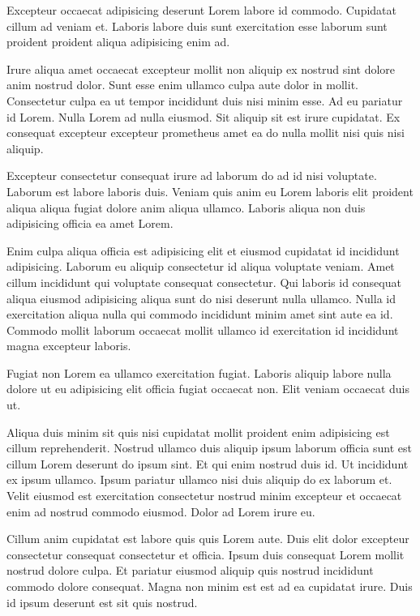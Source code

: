 Excepteur occaecat adipisicing deserunt Lorem labore id commodo. 
Cupidatat cillum ad veniam et. 
Laboris labore duis sunt exercitation esse laborum sunt proident proident aliqua adipisicing enim ad. 

Irure aliqua amet occaecat excepteur mollit non aliquip ex nostrud sint dolore anim nostrud dolor.
Sunt esse enim ullamco culpa aute dolor in mollit. 
Consectetur culpa ea ut tempor incididunt duis nisi minim esse. 
Ad eu pariatur id Lorem. 
Nulla Lorem ad nulla eiusmod. 
Sit aliquip sit est irure cupidatat. 
Ex consequat excepteur excepteur \gls{prometheus} amet ea do nulla mollit nisi quis nisi aliquip.

Excepteur consectetur consequat irure ad laborum do ad id nisi voluptate. 
Laborum est labore laboris duis. 
Veniam quis anim eu Lorem laboris elit proident aliqua aliqua fugiat dolore anim aliqua ullamco. 
Laboris aliqua non duis adipisicing officia ea amet Lorem.

Enim culpa aliqua officia est adipisicing elit et eiusmod cupidatat id incididunt adipisicing. 
Laborum eu aliquip consectetur id aliqua voluptate veniam. 
Amet cillum incididunt qui voluptate consequat consectetur. 
Qui laboris id consequat aliqua eiusmod adipisicing aliqua sunt do nisi deserunt nulla ullamco. 
Nulla id exercitation aliqua nulla qui commodo incididunt minim amet sint aute ea id. 
Commodo mollit laborum occaecat mollit ullamco id exercitation id incididunt magna excepteur laboris.

Fugiat non Lorem ea ullamco exercitation fugiat. 
Laboris aliquip labore nulla dolore ut eu adipisicing elit officia fugiat occaecat non. 
Elit veniam occaecat duis ut.

Aliqua duis minim sit quis nisi cupidatat mollit proident enim adipisicing est cillum reprehenderit. 
Nostrud ullamco duis aliquip ipsum laborum officia sunt est cillum Lorem deserunt do ipsum sint. 
Et qui enim nostrud duis id. Ut incididunt ex ipsum ullamco. 
Ipsum pariatur ullamco nisi duis aliquip do ex laborum et. 
Velit eiusmod est exercitation consectetur nostrud minim excepteur et occaecat enim ad nostrud commodo eiusmod. 
Dolor ad Lorem irure eu.

Cillum anim cupidatat est labore quis quis Lorem aute. 
Duis elit dolor excepteur consectetur consequat consectetur et officia. 
Ipsum duis consequat Lorem mollit nostrud dolore culpa. 
Et pariatur eiusmod aliquip quis nostrud incididunt commodo dolore consequat. 
Magna non minim est est ad ea cupidatat irure. 
Duis id ipsum deserunt est sit quis nostrud.

